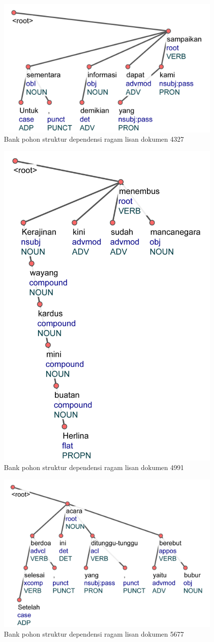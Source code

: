 \begin{figure}
	\centering \includegraphics[width=0.5
	\textwidth] {pics/lampiran/lampiranls4327.jpg} 
	\caption[]{Bank pohon struktur dependensi ragam lisan dokumen 4327} 
	\label{fig:lampiranls4327} 
\end{figure}

\begin{figure}
	\centering \includegraphics[width=0.45
	\textwidth] {pics/lampiran/lampiranls4991.jpg} 
	\caption[]{Bank pohon struktur dependensi ragam lisan dokumen 4991} 
	\label{fig:lampiranls4991} 
\end{figure}

\begin{figure}
	\centering \includegraphics[width=0.6
	\textwidth] {pics/lampiran/lampiranls5677.jpg} 
	\caption[]{Bank pohon struktur dependensi ragam lisan dokumen 5677} 
	\label{fig:lampiranls5677} 
\end{figure}

